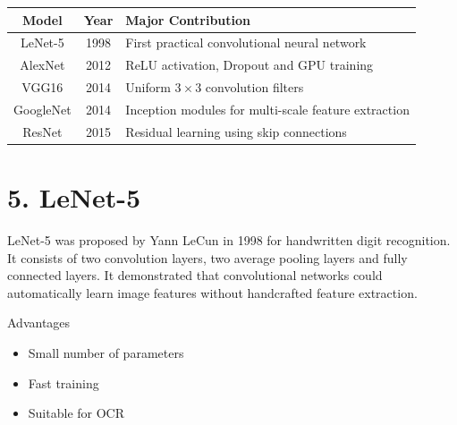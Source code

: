 \documentclass[11pt]{article}
\begin{document}
\begin{center}

\begin{tabular}{|c|c|p{7cm}|}

\hline

Model & Year & Major Contribution\\

\hline

LeNet-5 & 1998 &
First practical convolutional neural network\\

\hline

AlexNet & 2012 &
ReLU activation, Dropout and GPU training\\

\hline

VGG16 & 2014 &
Uniform $3\times3$ convolution filters\\

\hline

GoogleNet & 2014 &
Inception modules for multi-scale feature extraction\\

\hline

ResNet & 2015 &
Residual learning using skip connections\\

\hline

\end{tabular}

\end{center}

\section*{5. LeNet-5}

LeNet-5 was proposed by Yann LeCun in 1998 for handwritten digit
recognition. It consists of two convolution layers, two average pooling
layers and fully connected layers. It demonstrated that convolutional
networks could automatically learn image features without handcrafted
feature extraction.


Advantages

\begin{itemize}

\item Small number of parameters

\item Fast training

\item Suitable for OCR

\end{itemize}
\end{document}
